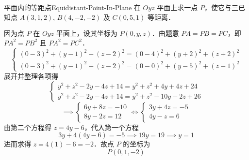 \begin{problem}{平面内的等距点}{Equidistant-Point-In-Plane}
    在 $Oyz$ 平面上求一点 $P$，使它与三已知点 $A(3, 1, 2)$, $B(4, -2, -2)$ 及 $C(0, 5, 1)$ 等距离．
\end{problem}

\begin{solution}
    因为点 $P$ 在 $Oyz$ 平面上，设其坐标为 $P(0, y, z)$．由题意 $PA = PB = PC$，即 $PA^2 = PB^2$ 且 $PA^2 = PC^2$．
    \begin{equation}
        \begin{cases}
            (0 - 3)^2 + (y - 1)^2 + (z - 2)^2 = (0 - 4)^2 + (y + 2)^2 + (z + 2)^2 \\
            (0 - 3)^2 + (y - 1)^2 + (z - 2)^2 = (0 - 0)^2 + (y - 5)^2 + (z - 1)^2
        \end{cases}
    \end{equation}
    展开并整理各项得
    \begin{equation}
        \begin{cases}
            y^2 + z^2 - 2y - 4z + 14 = y^2 + z^2 + 4y + 4z + 24 \\
            y^2 + z^2 - 2y - 4z + 14 = y^2 + z^2 - 10y - 2z + 26
        \end{cases}
    \end{equation}
    \begin{equation}
        \implies
        \begin{cases}
            6y + 8z = -10 \\
            8y - 2z = 12
        \end{cases}
        \iff
        \begin{cases}
            3y + 4z = -5 \\
            4y - z = 6
        \end{cases}
    \end{equation}
    由第二个方程得 $z = 4y - 6$，代入第一个方程
    \begin{equation}
        3y + 4(4y - 6) = -5 \implies 19y = 19 \implies y = 1
    \end{equation}
    进而求得 $z = 4(1) - 6 = -2$．故点 $P$ 的坐标为
    \begin{equation}
        \boxed{P(0, 1, -2)}
    \end{equation}
\end{solution}

\endinput
